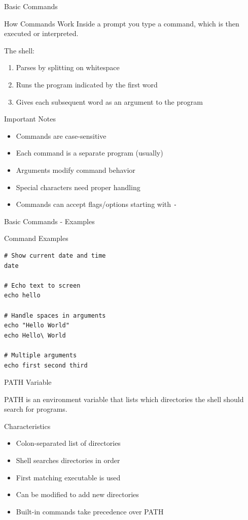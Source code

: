 \documentclass[presentation,aspectratio=1610]{beamer}
\begin{document}
\begin{frame}[label={sec:org51472af},fragile]{Basic Commands}
 \begin{block}{How Commands Work}
Inside a prompt you type a command, which is then executed or interpreted.

The shell:
\begin{enumerate}
\item Parses by splitting on whitespace
\item Runs the program indicated by the first word
\item Gives each subsequent word as an argument to the program
\end{enumerate}
\end{block}
\begin{alertblock}{Important Notes}
\begin{itemize}
\item Commands are \alert{case-sensitive}
\item Each command is a separate program (usually)
\item Arguments modify command behavior
\item Special characters need proper handling
\item Commands can accept flags/options starting with \texttt{-}
\end{itemize}
\end{alertblock}
\end{frame}
\begin{frame}[label={sec:org281b2e8},fragile]{Basic Commands - Examples}
 \begin{block}{Command Examples}
\begin{verbatim}
# Show current date and time
date

# Echo text to screen
echo hello

# Handle spaces in arguments
echo "Hello World"
echo Hello\ World

# Multiple arguments
echo first second third
\end{verbatim}
\end{block}
\end{frame}
\begin{frame}[label={sec:orgb1b9c68}]{PATH Variable}
\begin{definition}\label{sec:org9610dd6}
PATH is an environment variable that lists which directories the shell should search for programs.
\end{definition}
\begin{block}{Characteristics}
\begin{itemize}
\item Colon-separated list of directories
\item Shell searches directories in order
\item First matching executable is used
\item Can be modified to add new directories
\item Built-in commands take precedence over PATH
\end{itemize}
\end{block}
\end{frame}
\end{document}
